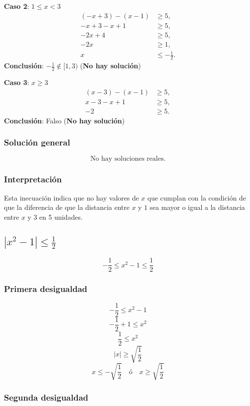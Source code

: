 \textbf{Caso 2}: $1 \leq x < 3$
\begin{align*}
    (-x+3) - (x-1) &\geq 5,\\
    -x+3 - x +1 &\geq 5,\\
    -2x +4 &\geq 5,\\
    -2x &\geq 1,\\
    x &\leq -\frac{1}{2}.
\end{align*}
\textbf{Conclusi\'on}: $-\frac{1}{2} \notin [1,3)$ \quad (\textbf{No hay soluci\'on})

\textbf{Caso 3}: $x \geq 3$
\begin{align*}
    (x-3) - (x-1) &\geq 5,\\
    x-3 - x +1 &\geq 5,\\
    -2 &\geq 5.
\end{align*}
\textbf{Conclusi\'on}: Falso \quad (\textbf{No hay soluci\'on})

\subsubsection*{Soluci\'on general}

\begin{equation*}
    \text{No hay soluciones reales.}
\end{equation*}


\subsubsection*{Interpretación}
Esta inecuación indica que no hay valores de $x$ que cumplan con la condición de que la diferencia de que la distancia entre $x$ y $1$ sea mayor o igual a la distancia entre $x$ y $3$ en 5 unidades.

\subsection*{$|x^2-1|\leq \frac{1}{2}$}

\[-\frac{1}{2} \leq x^2 - 1 \leq \frac{1}{2}\]

\subsubsection*{Primera desigualdad}
\[-\frac{1}{2} \leq x^2 - 1\]
\[-\frac{1}{2} + 1 \leq x^2\]
\[\frac{1}{2} \leq x^2\]
\[|x| \geq \sqrt{\frac{1}{2}}\]
\[x \leq -\sqrt{\frac{1}{2}} \quad \text{ó} \quad x \geq \sqrt{\frac{1}{2}}\]

\subsubsection*{Segunda desigualdad}

